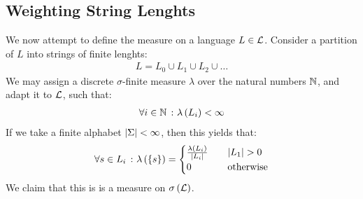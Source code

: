 \subsection{Weighting String Lenghts}
We now attempt to define the measure on a language \(L \in \mathcal{L}\).
Consider a partition of \(L\) into strings of finite lenghts:
\begin{align*}
  L = L_0 \cup L_1 \cup L_2 \cup \ldots
\end{align*}
We may assign a discrete \(\sigma\)-finite
measure \(\lambda\) over the natural numbers \(\mathbb{N}\),
and adapt it to \(\mathcal{L}\), such that:
\begin{align*}
  \forall i \in \mathbb{N} \ \colon \lambda\left(L_i\right) < \infty
\end{align*}
If we take a finite alphabet \(\left\lvert\Sigma\right\rvert < \infty\), then this yields that:
\begin{align*}
  \forall s \in L_i \ \colon
    \lambda \left(\left\{s\right\}\right)
      =
      \begin{cases}
        \frac{\lambda\left(L_i\right)}{\left\lvert L_i\right\rvert}
          & \quad \left\lvert L_1\right\rvert > 0 \\
        0 & \quad \text{otherwise}
      \end{cases}
\end{align*}
We claim that this is is a measure on \(\sigma\left(\mathcal{L}\right)\).



